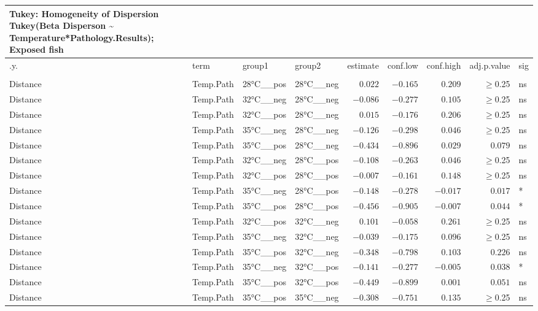 \documentclass[
]{article}
\begin{document}
\begin{longtable}{llllrrrrl}
\caption*{
{\large Tukey: Homogeneity of Dispersion} \\ 
{\small Tukey(Beta Disperson \textasciitilde{} Temperature*Pathology.Results); Exposed fish}
} \\ 
\toprule
.y. & term & group1 & group2 & estimate & conf.low & conf.high & adj.p.value & sig \\ 
\midrule\addlinespace[2.5pt]
\multicolumn{9}{l}{bray} \\ 
\midrule\addlinespace[2.5pt]
Distance & Temp.Path & 28°C\_\_pos & 28°C\_\_neg & $0.022$ & $-0.165$ & $0.209$ & $\geq$0.25 & ns \\ 
Distance & Temp.Path & 32°C\_\_neg & 28°C\_\_neg & $-0.086$ & $-0.277$ & $0.105$ & $\geq$0.25 & ns \\ 
Distance & Temp.Path & 32°C\_\_pos & 28°C\_\_neg & $0.015$ & $-0.176$ & $0.206$ & $\geq$0.25 & ns \\ 
Distance & Temp.Path & 35°C\_\_neg & 28°C\_\_neg & $-0.126$ & $-0.298$ & $0.046$ & $\geq$0.25 & ns \\ 
Distance & Temp.Path & 35°C\_\_pos & 28°C\_\_neg & $-0.434$ & $-0.896$ & $0.029$ & $0.079$ & ns \\ 
Distance & Temp.Path & 32°C\_\_neg & 28°C\_\_pos & $-0.108$ & $-0.263$ & $0.046$ & $\geq$0.25 & ns \\ 
Distance & Temp.Path & 32°C\_\_pos & 28°C\_\_pos & $-0.007$ & $-0.161$ & $0.148$ & $\geq$0.25 & ns \\ 
Distance & Temp.Path & 35°C\_\_neg & 28°C\_\_pos & $-0.148$ & $-0.278$ & $-0.017$ & $0.017$ & * \\ 
Distance & Temp.Path & 35°C\_\_pos & 28°C\_\_pos & $-0.456$ & $-0.905$ & $-0.007$ & $0.044$ & * \\ 
Distance & Temp.Path & 32°C\_\_pos & 32°C\_\_neg & $0.101$ & $-0.058$ & $0.261$ & $\geq$0.25 & ns \\ 
Distance & Temp.Path & 35°C\_\_neg & 32°C\_\_neg & $-0.039$ & $-0.175$ & $0.096$ & $\geq$0.25 & ns \\ 
Distance & Temp.Path & 35°C\_\_pos & 32°C\_\_neg & $-0.348$ & $-0.798$ & $0.103$ & $0.226$ & ns \\ 
Distance & Temp.Path & 35°C\_\_neg & 32°C\_\_pos & $-0.141$ & $-0.277$ & $-0.005$ & $0.038$ & * \\ 
Distance & Temp.Path & 35°C\_\_pos & 32°C\_\_pos & $-0.449$ & $-0.899$ & $0.001$ & $0.051$ & ns \\ 
Distance & Temp.Path & 35°C\_\_pos & 35°C\_\_neg & $-0.308$ & $-0.751$ & $0.135$ & $\geq$0.25 & ns \\ 

\end{longtable}
\end{document}
